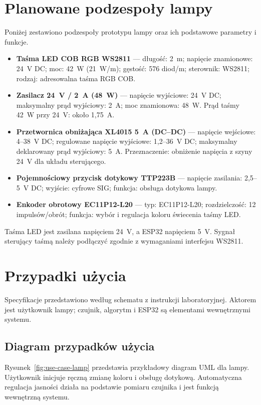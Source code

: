 \section{Planowane podzespoły lampy}

Poniżej zestawiono podzespoły prototypu lampy oraz ich podstawowe parametry i funkcje.

\begin{itemize}
\item \textbf{Taśma LED COB RGB WS2811} — długość: 2~m; napięcie znamionowe: 24~V DC; moc: 42~W (21~W/m); gęstość: 576 diod/m; sterownik: WS2811; rodzaj: adresowalna taśma RGB COB.
\item \textbf{Zasilacz 24~V / 2~A (48~W)} — napięcie wyjściowe: 24~V DC; maksymalny prąd wyjściowy: 2~A; moc znamionowa: 48~W. Prąd taśmy 42~W przy 24~V: około 1{,}75~A.
\item \textbf{Przetwornica obniżająca XL4015 5~A (DC--DC)} — napięcie wejściowe: 4--38~V DC; regulowane napięcie wyjściowe: 1{,}2--36~V DC; maksymalny deklarowany prąd wyjściowy: 5~A. Przeznaczenie: obniżenie napięcia z szyny 24~V dla układu sterującego. 
\item \textbf{Pojemnościowy przycisk dotykowy TTP223B} — napięcie zasilania: 2{,}5--5~V DC; wyjście: cyfrowe SIG; funkcja: obsługa dotykowa lampy.
\item \textbf{Enkoder obrotowy EC11P12-L20} — typ: EC11P12-L20; rozdzielczość: 12 impulsów/obrót; funkcja: wybór i regulacja koloru świecenia taśmy LED.
\end{itemize}

Taśma LED jest zasilana napięciem 24~V, a ESP32 napięciem 5~V. Sygnał sterujący taśmą należy podłączyć zgodnie z wymaganiami interfejsu WS2811.

\section{Przypadki użycia}

Specyfikacje przedstawiono według schematu z instrukcji laboratoryjnej. Aktorem jest użytkownik lampy; czujnik, algorytm i ESP32 są elementami wewnętrznymi systemu.

\subsection{Diagram przypadków użycia}
Rysunek~\ref{fig:use-case-lamp} przedstawia przykładowy diagram UML dla lampy. Użytkownik inicjuje ręczną zmianę koloru i obsługę dotykową. Automatyczna regulacja jasności działa na podstawie pomiaru czujnika i jest funkcją wewnętrzną systemu.

